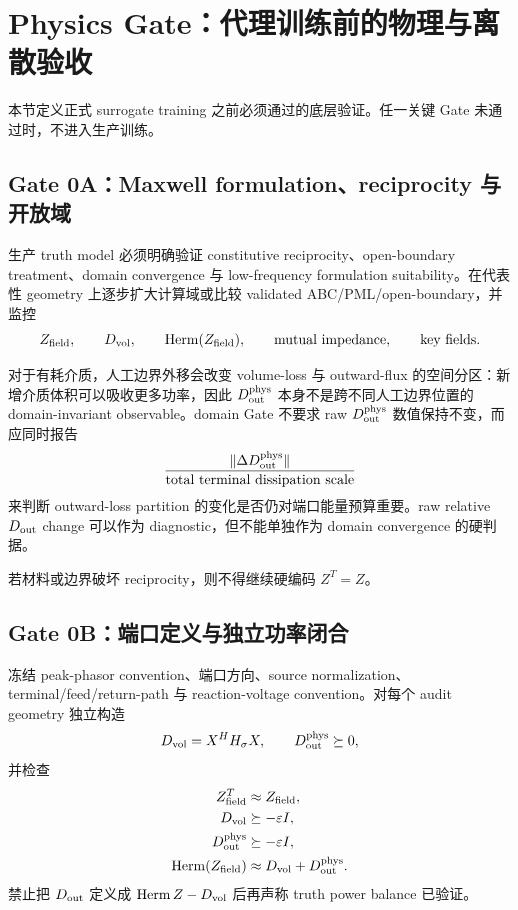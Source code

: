 \section{Physics Gate：代理训练前的物理与离散验收}

本节定义正式 surrogate training 之前必须通过的底层验证。任一关键 Gate 未通过时，不进入生产训练。

\subsection{Gate 0A：Maxwell formulation、reciprocity 与开放域}
生产 truth model 必须明确验证 constitutive reciprocity、open-boundary treatment、domain convergence 与 low-frequency formulation suitability。在代表性 geometry 上逐步扩大计算域或比较 validated ABC/PML/open-boundary，并监控
\begin{equation}
Z_{\rm field},\qquad D_{\rm vol},\qquad \operatorname{Herm}(Z_{\rm field}),\qquad \text{mutual impedance},\qquad \text{key fields}.
\end{equation}

对于有耗介质，人工边界外移会改变 volume-loss 与 outward-flux 的空间分区：新增介质体积可以吸收更多功率，因此 $D_{\rm out}^{\rm phys}$ 本身不是跨不同人工边界位置的 domain-invariant observable。domain Gate 不要求 raw $D_{\rm out}^{\rm phys}$ 数值保持不变，而应同时报告
\begin{equation}
\frac{\|\Delta D_{\rm out}^{\rm phys}\|}{\text{total terminal dissipation scale}}
\end{equation}
来判断 outward-loss partition 的变化是否仍对端口能量预算重要。raw relative $D_{\rm out}$ change 可以作为 diagnostic，但不能单独作为 domain convergence 的硬判据。

若材料或边界破坏 reciprocity，则不得继续硬编码 $Z^T=Z$。

\subsection{Gate 0B：端口定义与独立功率闭合}
冻结 peak-phasor convention、端口方向、source normalization、terminal/feed/return-path 与 reaction-voltage convention。对每个 audit geometry 独立构造
\begin{equation}
D_{\rm vol}=X^HH_\sigma X,
\qquad
D_{\rm out}^{\rm phys}\succeq0,
\end{equation}
并检查
\begin{align}
Z_{\rm field}^T&\approx Z_{\rm field},\\
D_{\rm vol}&\succeq-\varepsilon I,\\
D_{\rm out}^{\rm phys}&\succeq-\varepsilon I,\\
\operatorname{Herm}(Z_{\rm field})&\approx D_{\rm vol}+D_{\rm out}^{\rm phys}.
\end{align}
禁止把 $D_{\rm out}$ 定义成 $\operatorname{Herm}Z-D_{\rm vol}$ 后再声称 truth power balance 已验证。

